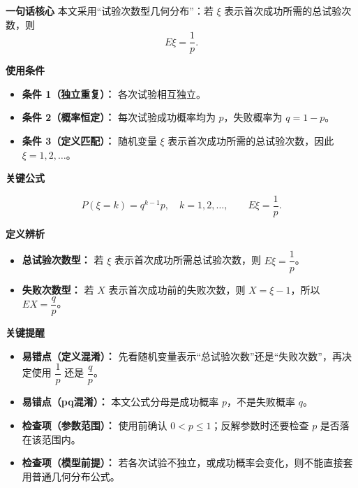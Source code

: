 \begin{summarybox}
	\textbf{\textcolor{CSummary}{一句话核心}}
	本文采用“试验次数型几何分布”：若 $\xi$ 表示首次成功所需的总试验次数，则
	\[
		E\xi=\frac{1}{p}.
	\]

	\medskip

	\textbf{\textcolor{CSummary}{使用条件}}

	\begin{itemize}[leftmargin=*, itemsep=0.5em, topsep=0.4em]
		\item \textbf{条件 1（独立重复）：} 各次试验相互独立。
		\item \textbf{条件 2（概率恒定）：} 每次试验成功概率均为 $p$，失败概率为 $q=1-p$。
		\item \textbf{条件 3（定义匹配）：} 随机变量 $\xi$ 表示首次成功所需的总试验次数，因此 $\xi=1,2,\dots$。
	\end{itemize}

	\medskip

	\textbf{\textcolor{CSummary}{关键公式}}

	\[
		P(\xi=k)=q^{k-1}p,\quad k=1,2,\dots,\qquad E\xi=\frac{1}{p}.
	\]

	\medskip

	\textbf{\textcolor{CSummary}{定义辨析}}

	\begin{itemize}[leftmargin=*, itemsep=0.5em, topsep=0.4em]
		\item \textbf{总试验次数型：} 若 $\xi$ 表示首次成功所需总试验次数，则 $E\xi=\dfrac{1}{p}$。
		\item \textbf{失败次数型：} 若 $X$ 表示首次成功前的失败次数，则 $X=\xi-1$，所以 $EX=\dfrac{q}{p}$。
	\end{itemize}

	\medskip

	\textbf{\textcolor{CSummary}{关键提醒}}

	\begin{itemize}[leftmargin=*, itemsep=0.5em, topsep=0.4em]
		\item \textbf{易错点（定义混淆）：} 先看随机变量表示“总试验次数”还是“失败次数”，再决定使用 $\dfrac{1}{p}$ 还是 $\dfrac{q}{p}$。
		\item \textbf{易错点（pq混淆）：} 本文公式分母是成功概率 $p$，不是失败概率 $q$。
		\item \textbf{检查项（参数范围）：} 使用前确认 $0<p\le1$；反解参数时还要检查 $p$ 是否落在该范围内。
		\item \textbf{检查项（模型前提）：} 若各次试验不独立，或成功概率会变化，则不能直接套用普通几何分布公式。
	\end{itemize}
\end{summarybox}